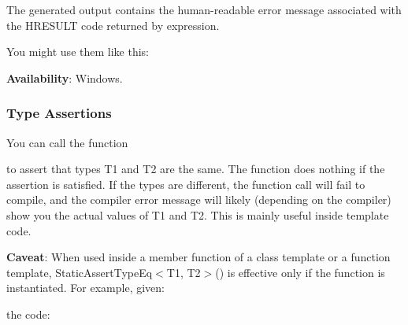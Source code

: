 The generated output contains the human-\/readable error message associated with the {\ttfamily H\+R\+E\+S\+U\+LT} code returned by {\ttfamily expression}.

You might use them like this\+:


\begin{DoxyCode}{0}
\end{DoxyCode}


{\bfseries{Availability}}\+: Windows.

\subsubsection*{Type Assertions}

You can call the function


\begin{DoxyCode}{0}
\end{DoxyCode}


to assert that types {\ttfamily T1} and {\ttfamily T2} are the same. The function does nothing if the assertion is satisfied. If the types are different, the function call will fail to compile, and the compiler error message will likely (depending on the compiler) show you the actual values of {\ttfamily T1} and {\ttfamily T2}. This is mainly useful inside template code.

{\bfseries{Caveat}}\+: When used inside a member function of a class template or a function template, {\ttfamily Static\+Assert\+Type\+Eq$<$T1, T2$>$()} is effective only if the function is instantiated. For example, given\+:


\begin{DoxyCode}{0}
\DoxyCodeLine{\};}
\end{DoxyCode}


the code\+:


\begin{DoxyCode}{0}
\end{DoxyCode}



